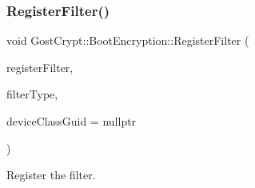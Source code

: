 \mbox{\label{class_gost_crypt_1_1_boot_encryption_a6644cab53713a12bfe4998605894dd8b}} 
\subsubsection{\texorpdfstring{Register\+Filter()}{RegisterFilter()}}
{\footnotesize\ttfamily void Gost\+Crypt\+::\+Boot\+Encryption\+::\+Register\+Filter (\begin{DoxyParamCaption}\item[{bool}]{register\+Filter,  }\item[{Filter\+Type}]{filter\+Type,  }\item[{const G\+U\+ID $\ast$}]{device\+Class\+Guid = {\ttfamily nullptr} }\end{DoxyParamCaption})\hspace{0.3cm}{\ttfamily [protected]}}



Register the filter. 


